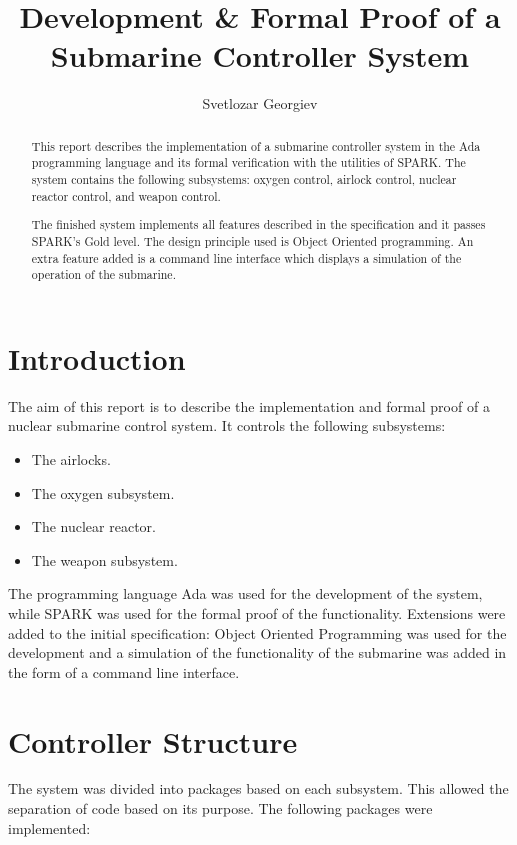 \documentclass{llncs}
\begin{document}
\author{Svetlozar Georgiev}
\title{Development \& Formal Proof of a Submarine Controller System}

\maketitle

\begin{abstract}
	This report describes the implementation of a submarine controller system in the Ada programming language and its formal verification with the utilities of SPARK. The system contains the following subsystems: oxygen control, airlock control, nuclear reactor control, and weapon control. 
	
	The finished system implements all features described in the specification and it passes SPARK's Gold level. The design principle used is Object Oriented programming. An extra feature added is a command line interface which displays a simulation of the operation of the submarine. 
\end{abstract}

\section{Introduction}
The aim of this report is to describe the implementation and formal proof of a nuclear submarine control system. It controls the following subsystems:

\begin{itemize}
	\item The airlocks.
	\item The oxygen subsystem.
	\item The nuclear reactor.
	\item The weapon subsystem.
\end{itemize}

The programming language Ada was used for the development of the system, while SPARK was used for the formal proof of the functionality. Extensions were added to the initial specification: Object Oriented Programming was used for the development and a simulation of the functionality of the submarine was added in the form of a command line interface.

\section{Controller Structure}
The system was divided into packages based on each subsystem. This allowed the separation of code based on its purpose. The following packages were implemented: 
\end{document}
